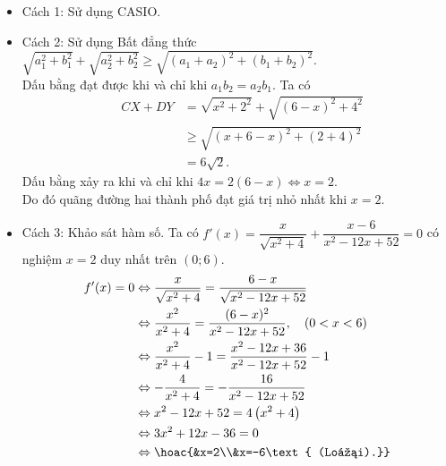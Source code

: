 \begin{ex}
{\begin{itemize}
		\item Cách 1: Sử dụng CASIO.
		\item Cách 2: Sử dụng Bất đẳng thức $\sqrt{a_1^2+b_1^2}+\sqrt{a_2^2+b_2^2}\ge \sqrt{(a_1+a_2)^2+(b_1+b_2)^2}$.\\
		Dấu bằng đạt được khi và chỉ khi $a_1b_2=a_2b_1$. Ta có
		 \begin{eqnarray*}
			&CX+DY&=\sqrt{x^2+2^2}+\sqrt{(6-x)^2+4^2}\\
			&&\ge \sqrt{(x+6-x)^2+(2+4)^2}\\
			&&=6\sqrt{2}.
		\end{eqnarray*}
		Dấu bằng xảy ra khi và chỉ khi $4x=2(6-x)\Leftrightarrow x=2$.\\
		Do đó quãng đường hai thành phố đạt giá trị nhỏ nhất khi $x=2$.
		\item Cách 3: Khảo sát hàm số. Ta có $f'(x)=\dfrac{x}{\sqrt{x^2+4}}+\dfrac{x-6}{x^2-12x+52}=0$ có nghiệm $x=2$ duy nhất trên $(0;6)$.
		\[\begin{aligned}
			f'(x)=0 & \Leftrightarrow \dfrac{x}{\sqrt{x^2+4}}=\dfrac{6-x}{\sqrt{x^2-12 x+52}} \\
			& \Leftrightarrow \dfrac{x^2}{x^2+4}=\dfrac{(6-x)^2}{x^2-12 x+52}, \quad(0<x<6) \\
			& \Leftrightarrow \dfrac{x^2}{x^2+4}-1=\dfrac{x^2-12 x+36}{x^2-12 x+52}-1 \\
			& \Leftrightarrow-\dfrac{4}{x^2+4}=-\dfrac{16}{x^2-12 x+52} \\
			& \Leftrightarrow x^2-12 x+52=4\left(x^2+4\right) \\
			& \Leftrightarrow 3 x^2+12 x-36=0 \\
			& \Leftrightarrow\hoac{&x=2\\&x=-6\text{ (Loại).}}
		\end{aligned}\]
	\end{itemize}
	}
\end{ex}


